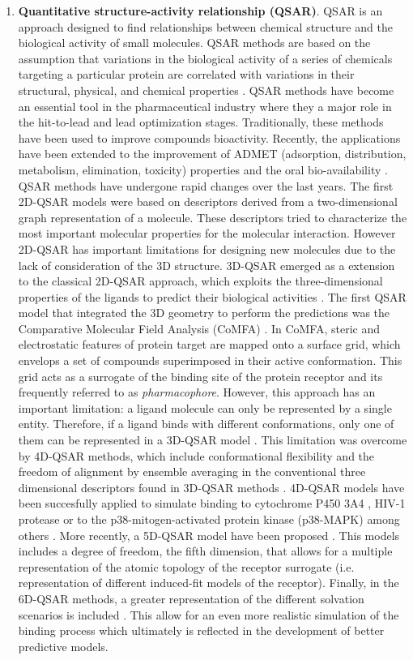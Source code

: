 \documentclass[12pt, a4paper,twoside]{tesi_upf}
\begin{document}
{\begin{enumerate}
\item \textbf{Quantitative structure-activity relationship (QSAR)}\label{qsar}. QSAR is an approach designed to find relationships between chemical structure and the biological activity of small molecules. QSAR methods are based on the assumption that variations in the biological  activity  of  a  series  of  chemicals  targeting a particular protein are correlated  with variations in their structural, physical, and chemical properties \cite{Perkins2003}. QSAR methods have become an essential tool in the pharmaceutical industry where they a major role in the hit-to-lead and lead optimization stages. Traditionally, these methods have been used to improve compounds bioactivity. Recently, the applications have been extended to the improvement of ADMET (adsorption, distribution, metabolism, elimination, toxicity) properties \cite{Penzotti2004, Obrezanova2007} and the oral bio-availability \cite{Yoshida2000}. QSAR  methods have undergone rapid changes over the last years. The first 2D-QSAR models were based on descriptors derived from a two-dimensional graph representation of a molecule. These descriptors tried to characterize the most important molecular properties for the molecular interaction. However 2D-QSAR has important limitations for designing new molecules due to the lack of consideration of the 3D structure. 3D-QSAR emerged as a extension to the classical 2D-QSAR approach, which exploits the three-dimensional properties of the ligands to predict their biological activities \cite{Verma2010}. The first QSAR model that integrated the 3D geometry to perform the predictions was the Comparative Molecular Field Analysis (CoMFA) \cite{Cramer1988}. In CoMFA, steric and electrostatic features of protein target are mapped onto a surface grid, which envelops a set of compounds superimposed in their active conformation. This grid acts as a surrogate of the binding site of the protein receptor and its frequently referred to as \textit{pharmacophore}. However, this approach has an important limitation: a ligand molecule can only be represented by a single entity. Therefore, if a ligand binds with different conformations, only one of them can be represented in a 3D-QSAR model \cite{Verma2010}. This limitation was overcome by 4D-QSAR methods, which include conformational flexibility and the freedom of alignment by ensemble averaging in the conventional three dimensional descriptors found in 3D-QSAR methods \cite{Hopfinger1997}. 4D-QSAR models have been succesfully applied to simulate binding to cytochrome P450 3A4 \cite{Ekins2000}, HIV-1 protease \cite{Iyer2007} or to the p38-mitogen-activated protein kinase (p38-MAPK) \cite{Romeiro2010} among others \cite{Andrade2010}. More recently, a 5D-QSAR model have been proposed \cite{Vedani2002}. This models includes a degree of freedom, the fifth dimension, that allows for a multiple representation of the atomic topology of the receptor surrogate (i.e. representation of different induced-fit models of the receptor). Finally, in the 6D-QSAR methods, a greater representation of the different solvation scenarios is included \cite{Vedani2005}. This allow for an even more realistic simulation of the binding process which ultimately is reflected in the development of better predictive models.   

\end{enumerate}}
\end{document}
